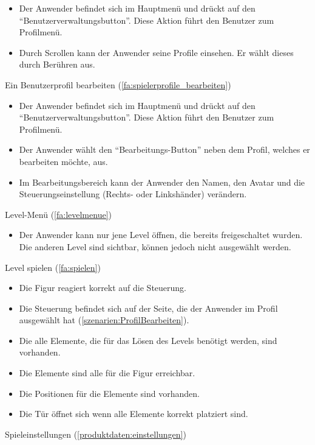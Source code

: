 \documentclass{scrartcl}
\begin{document}
\begin{telist}
	\begin{itemize}
		\item Der Anwender befindet sich im Hauptmenü und drückt auf den \enquote{Benutzerverwaltungsbutton}. Diese Aktion führt den Benutzer zum Profilmenü.
		\item Durch Scrollen kann der Anwender seine Profile einsehen. Er wählt dieses durch Berühren aus. 
	\end{itemize}
	\item Ein Benutzerprofil bearbeiten (\ref{fa:spielerprofile_bearbeiten})
	\begin{itemize}
		\item Der Anwender befindet sich im Hauptmenü und drückt auf den \enquote{Benutzerverwaltungsbutton}. Diese Aktion führt den Benutzer zum Profilmenü.
		\item Der Anwender wählt den \enquote{Bearbeitungs-Button} neben dem Profil, welches er bearbeiten möchte, aus.
		\item Im Bearbeitungsbereich kann der Anwender den Namen, den Avatar und die Steuerungseinstellung (Rechts- oder Linkshänder) verändern.
	\end{itemize}
	\item Level-Menü (\ref{fa:levelmenue})
	\begin{itemize}
		\item Der Anwender kann nur jene Level öffnen, die bereits freigeschaltet wurden. Die anderen Level sind sichtbar, können jedoch nicht ausgewählt werden.
	\end{itemize}
	\item Level spielen (\ref{fa:spielen})
	\begin{itemize}
		\item Die Figur reagiert korrekt auf die Steuerung.
		\item Die Steuerung befindet sich auf der Seite, die der Anwender im Profil ausgewählt hat (\ref{szenarien:ProfilBearbeiten}).
		\item Die alle Elemente, die für das Lösen des Levels benötigt werden, sind vorhanden.
		\item Die Elemente sind alle für die Figur erreichbar.
		\item Die Positionen für die Elemente sind vorhanden.
		\item Die Tür öffnet sich wenn alle Elemente korrekt platziert sind.
	\end{itemize}
	\item Spieleinstellungen (\ref{produktdaten:einstellungen})
	\begin{itemize}

\end{itemize}
\end{telist}
\end{document}

